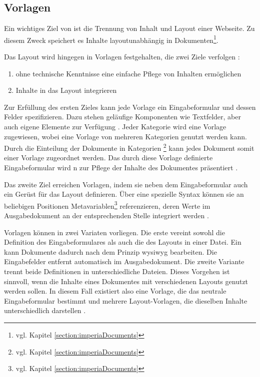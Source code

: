     \subsection{Vorlagen}
        \label{section:imperiaTemplates}
        Ein wichtiges Ziel von {\imperia} ist die Trennung von Inhalt
        und Layout einer Webseite.
        Zu diesem Zweck speichert es Inhalte layoutunabhängig
        in Dokumenten\footnote{vgl. Kapitel \ref{section:imperiaDocuments}}.

        Das Layout wird hingegen in Vorlagen festgehalten,
        die zwei Ziele verfolgen
        \cite[Kapitel 36]{imperia:ecmd}:

        \begin{enumerate}
            \item {\editors} ohne technische Kenntnisse eine einfache Pflege von Inhalten ermöglichen
            \item Inhalte in das Layout integrieren
        \end{enumerate}

        Zur Erfüllung des ersten Zieles kann jede Vorlage ein Eingabeformular
        und dessen Felder spezifizieren.
        Dazu stehen geläufige Komponenten wie Textfelder,
        aber auch {\imperia} eigene Elemente zur Verfügung
        \cite[Kapitel 1.1.4]{imperia:ecmd}.
        Jeder Kategorie wird eine Vorlage zugewiesen,
        wobei eine Vorlage von mehreren Kategorien genutzt werden kann.
        Durch die Einteilung der Dokumente in Kategorien
        \footnote{vgl. Kapitel \ref{section:imperiaDocuments}}
        kann jedes Dokument somit einer Vorlage zugeordnet werden.
        Das durch diese Vorlage definierte Eingabeformular
        wird {\editors n} zur Pflege der Inhalte des Dokumentes präsentiert
        \cite[Kapitel 1.1.4]{imperia:ecmd}.

        Das zweite Ziel erreichen Vorlagen,
        indem sie neben dem Eingabeformular auch ein Gerüst für das
        Layout definieren.
        Über eine spezielle Syntax können sie an beliebigen Positionen
        Metavariablen\footnote{vgl. Kapitel \ref{section:imperiaDocuments}} referenzieren,
        deren Werte im Ausgabedokument an der entsprechenden Stelle integriert werden
        \cite[Kapitel 36]{imperia:ecmd}.

        Vorlagen können in zwei Variaten vorliegen.
        Die erste vereint sowohl die Definition des Eingabeformulares
        als auch die des Layouts in einer Datei.
        Ein {\editor} kann Dokumente dadurch nach dem Prinzip \gls{wysiwyg} bearbeiten.
        Die Eingabefelder entfernt {\imperia} automatisch im Ausgabedokument.
        Die zweite Variante trennt beide Definitionen in unterschiedliche Dateien.
        Dieses Vorgehen ist sinnvoll, wenn die Inhalte eines Dokumentes mit
        verschiedenen Layouts genutzt werden sollen.
        In diesem Fall existiert also eine Vorlage,
        die das neutrale Eingabeformular bestimmt
        und mehrere Layout-Vorlagen, die dieselben Inhalte unterschiedlich darstellen
        \cite[Kapitel 36]{imperia:ecmd}.

